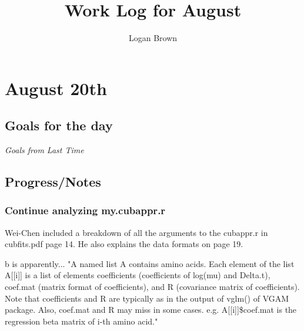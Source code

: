 \documentclass[11pt]{article} %
\title{Work Log for August}
\author{Logan Brown}
\newcommand\NoIndent[1]{%
  \par\vbox{\parbox[t]{\linewidth}{#1}}%
}
\begin{document}


\newpage
\setcounter{section}{19} %
\setcounter{subsection}{-1}
\setcounter{subsubsection}{0}

\section{August 20th}
\subsection{Goals for the day}
\textit{Goals from Last Time}

\subsection{Progress/Notes}
\subsubsection{Continue analyzing my.cubappr.r}
Wei-Chen included a breakdown of all the arguments to the cubappr.r in cubfits.pdf page 14.
He also explains the data formats on page 19.

b is apparently... 
"A named list A contains amino acids. Each element of the list A[[i]] is a list of elements
coefficients (coefficients of log(mu) and Delta.t), coef.mat (matrix format of coefficients),
and R (covariance matrix of coefficients). Note that coefficients and R are typically as
in the output of vglm() of VGAM package. Also, coef.mat and R may miss in some cases.
e.g. A[[i]]\$coef.mat is the regression beta matrix of i-th amino acid."
\end{document}
